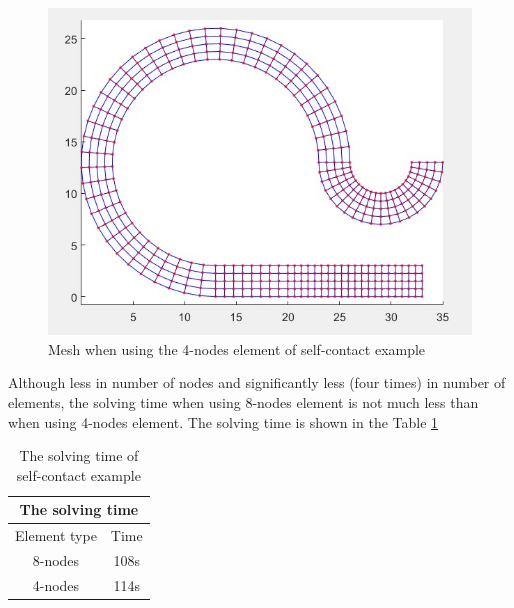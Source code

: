 \begin{figure}[H]
    \centering
    \includegraphics[scale=0.7]{Figures/chapter5/q4_mesh_s.jpg}
    \decoRule
    \caption{Mesh when using the 4-nodes element of self-contact example}
    \label{fig:q4_mesh_s}
\end{figure}
\begin{table}[H]
    \centering
    \caption{Mesh properties of self-contact example}
    \label{tab:mp_s}
\end{table}
\noindent
Although less in number of nodes and significantly less (four times) in number of elements, the solving time when using 8-nodes element is not much less than when using 4-nodes element.
The solving time is shown in the Table \ref{tab:st_s}
\begin{table}[H]
    \centering
    \begin{tabular}{|c|c|}
    \multicolumn{2}{c}{The solving time} \\ \hline
         Element type & Time \\ \hline 
         8-nodes           & 108s \\ \hline
         4-nodes           & 114s \\ \hline
    \end{tabular}
    \caption{The solving time of self-contact example}
    \label{tab:st_s}
\end{table}
\newpage

